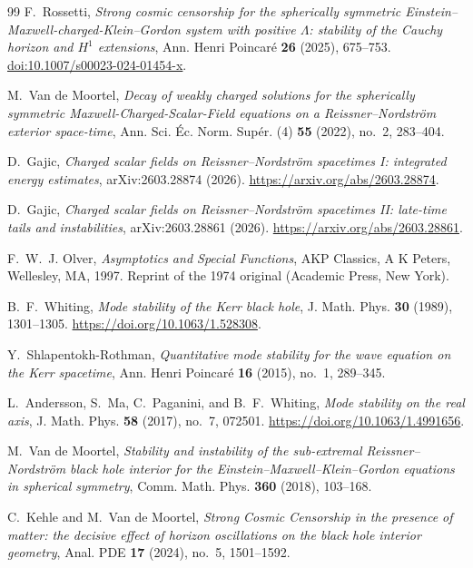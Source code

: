 \documentclass[11pt]{article}
\numberwithin{equation}{section}
\begin{document}
\begin{thebibliography}{99}
		F.~Rossetti,
		\emph{Strong cosmic censorship for the spherically symmetric Einstein--Maxwell-charged-Klein--Gordon system with positive $\Lambda$: stability of the Cauchy horizon and $H^1$ extensions},
		Ann. Henri Poincar\'e \textbf{26} (2025), 675--753.
		\href{https://doi.org/10.1007/s00023-024-01454-x}{doi:10.1007/s00023-024-01454-x}.
		
		M.~Van de Moortel,
		\emph{Decay of weakly charged solutions for the spherically symmetric
			Maxwell-Charged-Scalar-Field equations on a Reissner--Nordstr\"om
			exterior space-time},
		Ann. Sci. \'Ec. Norm. Sup\'er. (4) \textbf{55} (2022), no.~2, 283--404.
		
		D.~Gajic,
		\emph{Charged scalar fields on Reissner--Nordstr\"om spacetimes I:
			integrated energy estimates},
		arXiv:2603.28874 (2026).
		\url{https://arxiv.org/abs/2603.28874}.
		
		D.~Gajic,
		\emph{Charged scalar fields on Reissner--Nordstr\"om spacetimes II:
			late-time tails and instabilities},
		arXiv:2603.28861 (2026).
		\url{https://arxiv.org/abs/2603.28861}.
		
		F.~W.~J. Olver,
		\emph{Asymptotics and Special Functions},
		AKP Classics,
		A K Peters, Wellesley, MA, 1997.
		Reprint of the 1974 original (Academic Press, New York).
		
		B.~F.~Whiting,
		\emph{Mode stability of the Kerr black hole},
		J. Math. Phys. \textbf{30} (1989), 1301--1305.
		\url{https://doi.org/10.1063/1.528308}.
		
		Y.~Shlapentokh-Rothman,
		\emph{Quantitative mode stability for the wave equation on the Kerr
			spacetime},
		Ann. Henri Poincar\'e \textbf{16} (2015), no.~1, 289--345.
		
		{
			L.~Andersson, S.~Ma, C.~Paganini, and B.~F.~Whiting,
			\emph{Mode stability on the real axis},
			J. Math. Phys. \textbf{58} (2017), no.~7, 072501.
			\url{https://doi.org/10.1063/1.4991656}.}
		
		
		M.~Van de Moortel,
		\emph{Stability and instability of the sub-extremal
			Reissner--Nordstr\"om black hole interior for the
			Einstein--Maxwell--Klein--Gordon equations in spherical symmetry},
		Comm. Math. Phys. \textbf{360} (2018), 103--168.
		
		C.~Kehle and M.~Van de Moortel,
		\emph{Strong Cosmic Censorship in the presence of matter:
			the decisive effect of horizon oscillations on the black hole
			interior geometry},
		Anal. PDE \textbf{17} (2024), no.~5, 1501--1592.
		

\end{thebibliography}
\end{document}
